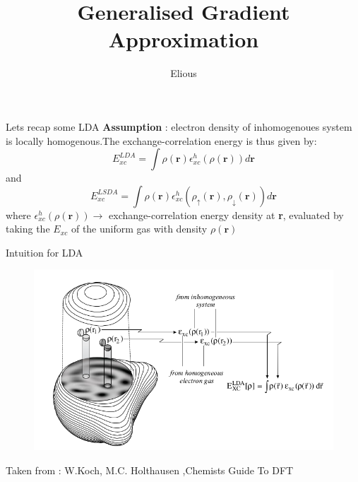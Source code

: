 \documentclass{beamer}
\title{Generalised Gradient Approximation}
\author{Elious}
\date{}
\begin{document}
	\begin{frame}
	\titlepage
	\end{frame}
	\begin{frame}[t]{Lets recap some LDA}
	\textbf{Assumption} : electron density of inhomogenoues system is locally homogenous.The exchange-correlation energy is thus given by: 
	\begin{equation}\label{eq:1}
	E_{xc}^{LDA} = \displaystyle{\int }\rho(\textbf{r})\epsilon_{xc}^{h}(\rho(\textbf{r}))d\textbf{r}
	\end{equation}
	and 
	\begin{equation}\label{eq:2}
	E_{xc}^{LSDA} = \displaystyle{\int }\rho(\textbf{r})\epsilon_{xc}^{h}(\rho_{\uparrow}(\textbf{r}),\rho_{\downarrow}(\textbf{r}))d\textbf{r}
	\end{equation}
	where
	$\epsilon_{xc}^{h}(\rho(\textbf{r})) \rightarrow$ exchange-correlation energy density at \textbf{r}, evaluated by taking the $E_{xc}$ of the uniform gas with density $\rho(\textbf{r})$
	\end{frame}
	
	\begin{frame}[t]{Intuition for LDA}
	\begin{figure}
	\centering
	\includegraphics[scale=0.40]{LDA_intuition.png}
	\end{figure}
	Taken from : W.Koch, M.C. Holthausen ,Chemists Guide To DFT
	\end{frame}	
	
\end{document}

